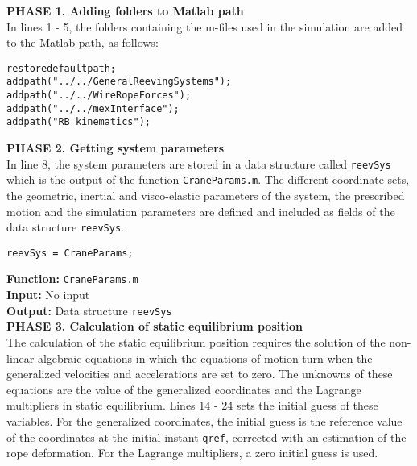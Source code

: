 \textbf{PHASE 1. Adding folders to Matlab path} \\

In lines 1 - 5, the folders containing the m-files used in the simulation are added to the Matlab path, as follows:

{\begin{tcolorbox}\begin{lstlisting}[style=Matlab-editor]
restoredefaultpath;
addpath("../../GeneralReevingSystems");
addpath("../../WireRopeForces");
addpath("../../mexInterface");
addpath("RB_kinematics");
\end{lstlisting}\end{tcolorbox}}
 

\textbf{PHASE 2. Getting system parameters} \\

In line 8, the system parameters are stored in a data structure called \texttt{reevSys} which is the output of the function \texttt{CraneParams.m}. The different coordinate sets, the geometric, inertial and visco-elastic parameters of the system, the prescribed motion and the simulation parameters are defined and included as fields of the data structure \texttt{reevSys}. 

{\begin{tcolorbox}\begin{lstlisting}[style=Matlab-editor]
% Getting system parameters %
reevSys = CraneParams;
\end{lstlisting}\end{tcolorbox}}


\setlength{\parindent}{0cm}
\textbf{Function:} \texttt{CraneParams.m} \\
\textbf{Input:} No input \\
\textbf{Output:} Data structure \texttt{reevSys} \\

\textbf{PHASE 3. Calculation of static equilibrium position} \\

The calculation of the static equilibrium position requires the solution of the non-linear algebraic equations in which the equations of motion turn when the generalized velocities and accelerations are set to zero. The unknowns of these equations are the value of the generalized coordinates and the Lagrange multipliers in static equilibrium. Lines 14 - 24 sets the initial guess of these variables. For the generalized coordinates, the initial guess is the reference value of the coordinates at the initial instant \texttt{qref}, corrected with an estimation of the rope deformation. For the Lagrange multipliers, a zero initial guess is used.

